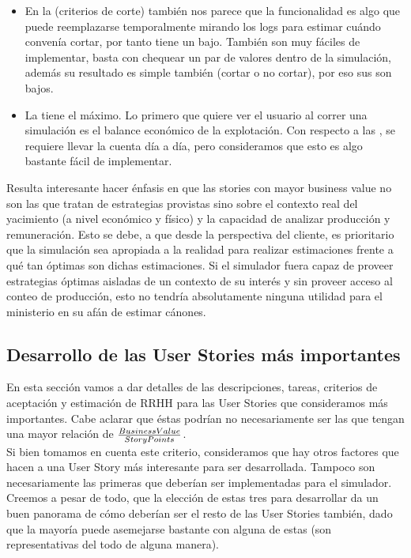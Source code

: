 \begin{itemize}
  \item En la  (criterios de corte) también nos parece que la funcionalidad es algo que puede reemplazarse temporalmente mirando los logs para estimar cuándo convenía cortar, por tanto tiene un \BV{} bajo. También son muy fáciles de implementar, basta con chequear un par de valores dentro de la simulación, además su resultado es simple también (cortar o no cortar), por eso sus \SP{} son bajos. 

  \item La  tiene el \BV{} máximo. Lo primero que quiere ver el usuario al correr una simulación es el balance económico de la explotación. Con respecto a las \SP{}, se requiere llevar la cuenta día a día, pero consideramos que esto es algo bastante fácil de implementar.
\end{itemize}

Resulta interesante hacer énfasis en que las stories con mayor business value no son las que tratan de estrategias provistas sino sobre el contexto real del yacimiento (a nivel económico y físico) y la capacidad de analizar producción y remuneración. Esto se debe, a que desde la perspectiva del cliente, es prioritario que la simulación sea apropiada a la realidad para realizar estimaciones frente a qué tan óptimas son dichas estimaciones. Si el simulador fuera capaz de proveer estrategias óptimas aisladas de un contexto de su interés y sin proveer acceso al conteo de producción, esto no tendría absolutamente ninguna utilidad para el ministerio en su afán de estimar cánones.

\newpage
\subsection{Desarrollo de las User Stories más importantes}

En esta sección vamos a dar detalles de las descripciones, tareas, criterios de aceptación y estimación de RRHH para las User Stories que consideramos más importantes. Cabe aclarar que éstas podrían no necesariamente ser las que tengan una mayor relación de \( \frac{Business Value{}}{Story Points{}} \). \\

Si bien tomamos en cuenta este criterio, consideramos que hay otros factores que hacen a una User Story más interesante para ser desarrollada. Tampoco son necesariamente las primeras que deberían ser implementadas para el simulador. Creemos a pesar de todo, que la elección de estas tres para desarrollar da un buen panorama de cómo deberían ser el resto de las User Stories también, dado que la mayoría puede asemejarse bastante con alguna de estas (son representativas del todo de alguna manera). \\

